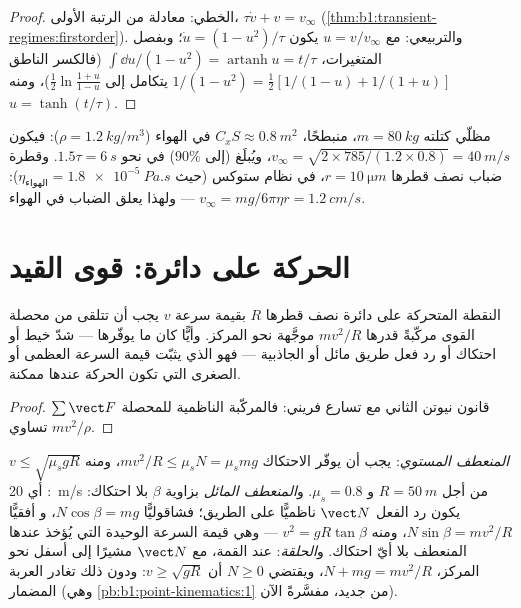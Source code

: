 \begin{proof}
الخطي: معادلة من الرتبة الأولى، $\tau\dot v + v = v_\infty$
(\cref{thm:b1:transient-regimes:firstorder}). والتربيعي: مع
$u = v/v_\infty$ يكون $\dot u = (1 - u^2)/\tau$؛ وبفصل المتغيرات،
$\int\dd u/(1 - u^2) = \operatorname{artanh}u = t/\tau$ (فالكسر
الناطق $1/(1 - u^2) = \tfrac12[1/(1 - u) + 1/(1 + u)]$ يتكامل إلى
$\tfrac12\ln\frac{1 + u}{1 - u}$)، ومنه $u = \tanh(t/\tau)$.
\end{proof}

\begin{example}\label{ex:b1:newton-dynamics:terminal}
مظلّي كتلته $m = \qty{80}{kg}$، منبطحًا، $C_xS \approx \qty{0.8}{m^2}$
في الهواء ($\rho = \qty{1.2}{kg/m^3}$): فيكون $v_\infty = \sqrt{2 \times 785/(1.2
\times 0.8)} = \qty{40}{m/s}$، ويُبلَغ (إلى $90\%$) في نحو $1.5\tau =
\qty{6}{s}$. وقطرة ضباب نصف قطرها $r = \qty{10}{\micro m}$، في نظام ستوكس
(حيث $\eta_{\text{الهواء}} = \qty{1.8e-5}{Pa.s}$): $v_\infty = mg/6\pi\eta r =
\qty{1.2}{cm/s}$ --- ولهذا يعلق الضباب في الهواء.
\end{example}

\section{الحركة على دائرة: قوى القيد}

\begin{proposition}\label{prop:b1:newton-dynamics:centripetal}
النقطة المتحركة على دائرة نصف قطرها $R$ بقيمة سرعة $v$ يجب أن تتلقى
من محصلة القوى مركّبةً قدرها $mv^2/R$ موجَّهة نحو
المركز. وأيًّا كان ما يوفّرها --- شدّ خيط أو احتكاك أو
رد فعل طريق مائل أو الجاذبية --- فهو الذي يثبّت قيمة السرعة العظمى أو
الصغرى التي تكون الحركة عندها ممكنة.
\end{proposition}

\begin{proof}
قانون نيوتن الثاني مع تسارع فريني: فالمركّبة الناظمية
للمحصلة $\sum\vect F$ تساوي $mv^2/\rho$.
\end{proof}

\begin{example}\label{ex:b1:newton-dynamics:circles}
\emph{المنعطف المستوي}: يجب أن يوفّر الاحتكاك $mv^2/R \leq \mu_sN = \mu_smg$،
ومنه $v \leq \sqrt{\mu_sgR}$: أي \qty{20}{m/s} من أجل $R = \qty{50}{m}$ و
$\mu_s = 0.8$. و\emph{المنعطف المائل} بزاوية $\beta$ بلا احتكاك: يكون
رد الفعل $\vect N$ ناظميًّا على الطريق؛ فشاقوليًّا $N\cos\beta = mg$، و
أفقيًّا $N\sin\beta = mv^2/R$، ومنه $v^2 = gR\tan\beta$ --- وهي قيمة السرعة
الوحيدة التي يُؤخذ عندها المنعطف بلا أيّ احتكاك. و\emph{الحلقة}: عند
القمة، مع $\vect N$ مشيرًا إلى أسفل نحو المركز، $N + mg =
mv^2/R$، ويقتضي $N \geq 0$ أن $v \geq \sqrt{gR}$: ودون ذلك تغادر العربة
المضمار (وهي \cref{pb:b1:point-kinematics:1} من جديد، مفسَّرةً الآن).
\end{example}

